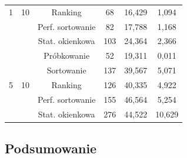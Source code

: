 \documentclass[magisterska]{pracamgr}
\begin{document}
\begin{table}[H]
{\begin{tabular}{@{}cccccc@{}}
1                    & 10           & Ranking                & 68       & 16,429                   & 1,094                   \\
                     &              & Perf. sortowanie & 82       & 17,788                   & 1,168                   \\
                     &              & Stat. okienkowa    & 103      & 24,364                   & 2,366                   \\ \midrule
                     &              & Próbkowanie            & 52       & 19,311                   & 0,011                   \\
                     &              & Sortowanie             & 137      & 39,567                   & 5,071                   \\
5                    & 10           & Ranking                & 126      & 40,335                   & 4,922                   \\
                     &              & Perf. sortowanie & 155      & 46,564                   & 5,254                   \\
                     &              & Stat. okienkowa    & 276      & 44,522                   & 10,629                  \\ \bottomrule
\end{tabular}%
}
\end{table}

\subsection{Podsumowanie}

\begin{table}[H]
\centering
\caption{Podsumowanie wykonania algorytmu \textit{TeraSort} na Hadoopie.}
\label{tab:my-table}
\end{table}
\end{document}
